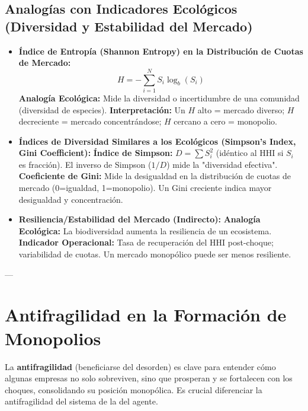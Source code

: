 \documentclass{article}
\begin{document}
\subsection{Analogías con Indicadores Ecológicos (Diversidad y Estabilidad del Mercado)}
\begin{itemize}
    \item \textbf{Índice de Entropía (Shannon Entropy) en la Distribución de Cuotas de Mercado:}
        $$H = -\sum_{i=1}^{N} S_i \log_b(S_i)$$
        \textbf{Analogía Ecológica:} Mide la diversidad o incertidumbre de una comunidad (diversidad de especies).
        \textbf{Interpretación:} Un $H$ alto = mercado diverso; $H$ decreciente = mercado concentrándose; $H$ cercano a cero = monopolio.
    \item \textbf{Índices de Diversidad Similares a los Ecológicos (Simpson's Index, Gini Coefficient):}
        \textbf{Índice de Simpson:} $D = \sum S_i^2$ (idéntico al HHI si $S_i$ es fracción). El inverso de Simpson ($1/D$) mide la "diversidad efectiva".
        \textbf{Coeficiente de Gini:} Mide la desigualdad en la distribución de cuotas de mercado (0=igualdad, 1=monopolio). Un Gini creciente indica mayor desigualdad y concentración.
    \item \textbf{Resiliencia/Estabilidad del Mercado (Indirecto):}
        \textbf{Analogía Ecológica:} La biodiversidad aumenta la resiliencia de un ecosistema.
        \textbf{Indicador Operacional:} Tasa de recuperación del HHI post-choque; variabilidad de cuotas. Un mercado monopólico puede ser menos resiliente.
\end{itemize}

---

\section{Antifragilidad en la Formación de Monopolios}

La \textbf{antifragilidad} (beneficiarse del desorden) es clave para entender cómo algunas empresas no solo sobreviven, sino que prosperan y se fortalecen con los choques, consolidando su posición monopólica. Es crucial diferenciar la antifragilidad del sistema de la del agente.
\end{document}
